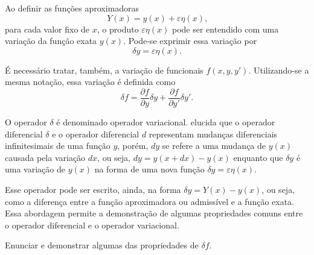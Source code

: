 \documentclass[
	12pt,				%
	openright,			%
    twoside,			%
	a4paper,			%
	english,			%
	french,				%
	spanish,			%
	brazil				%
	]{abntex2}
\numberwithin{lema}{chapter}
\numberwithin{teorema}{chapter}
\numberwithin{definicao}{chapter}
\numberwithin{figure}{chapter}
\begin{document}
Ao definir as funções aproximadoras
$$
	Y(x)=y(x)+\varepsilon \eta(x)
	\text{,}
$$
para cada valor fixo de $x$, o produto $\varepsilon \eta(x)$ pode ser entendido com uma variação da função exata $y(x)$. Pode-se exprimir essa variação por
$$
	\delta y=\varepsilon \eta(x)
	\text{.}
$$

É necessário tratar, também, a variação de funcionais $f(x, y, y')$. Utilizando-se a mesma notação, essa variação é definida como
$$
	\delta f = \frac{\partial f}{\partial y}\delta y + \frac{\partial f}{\partial y'}\delta y'
	\text{.}
$$

O operador $\delta$ é denominado operador variacional.  elucida que o operador diferencial $\delta$ e o operador diferencial $d$ representam mudanças diferenciais infinitesimais de uma função $y$, porém, $dy$ se refere a uma mudança de $y(x)$ causada pela variação $dx$, ou seja, $dy=y(x+dx)-y(x)$ enquanto que $\delta y$ é uma variação de $y(x)$ na forma de uma nova função $\delta y=\varepsilon \eta(x)$.

Esse operador pode ser escrito, ainda, na forma $\delta y = Y(x)-y(x)$, ou seja, como a diferença entre a função aproximadora ou admissível e a função exata. {\color{red}Essa abordagem permite a demonstração de algumas propriedades comuns entre o operador diferencial e o operador variacional.}

{\color{red}Enunciar e demonstrar algumas das propriedades de $\delta f$.}




%

\end{document}
